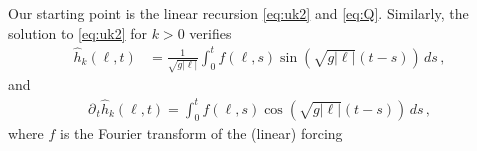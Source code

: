 \documentclass[11pt]{article}
\theoremstyle{plain}
\theoremstyle{definition}
\theoremstyle{definition}
\def\p{\text{\bf\emph{p}}}
\def\ft #1{{\widehat{#1}}}
\def\p{{\partial\hspace{1pt}}}
\def\comm#1#2{{\llbracket#1,#2\rrbracket}}
\begin{document}

Our starting point is the linear recursion \eqref{eq:uk2} and \eqref{eq:Q}. Similarly, the solution to \eqref{eq:uk2} for $k>0$ verifies
\begin{align}\label{recurrencecubic}
\ft{h}_k(\ell,t) &= \frac{1}{\sqrt{g |\ell|}} \int_0^t f(\ell,s) \sin\left( \sqrt{g|\ell|} (t-s)\right) \,ds \,,
\end{align}
and
\begin{align}\label{recurrencecubic2}
\p_{\!t} \ft{h}_k(\ell,t) = \int_0^t f(\ell,s) \cos\left( \sqrt{g|\ell|} (t-s)\right) \,ds\,,
\end{align}
where  $f$ is the Fourier transform of the (linear) forcing
\end{document}
